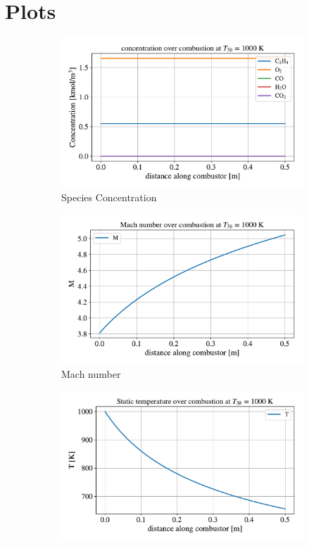 \documentclass[a4paper]{article}
\begin{document}
\section{Plots}\label{app:other_plots}
\begin{figure}[H]
    \centering
    \begin{subfigure}[h]{0.49\linewidth}
        \includegraphics[width=\linewidth]{part_2_img/concentration_1000.pdf}
        \caption{Species Concentration}
        \label{subfig:concentration_1000}
    \end{subfigure}
    \begin{subfigure}[h]{0.49\linewidth}
        \includegraphics[width=\linewidth]{part_2_img/mach_1000.pdf}
        \caption{Mach number}
        \label{subfig:mach_1000}
    \end{subfigure}
    \begin{subfigure}[h]{0.49\linewidth}
        \includegraphics[width=\linewidth]{part_2_img/static_temp_1000.pdf}

\end{subfigure}
\end{figure}
\end{document}
